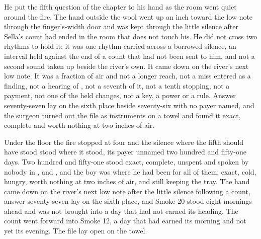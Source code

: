 He put the fifth question of the chapter to his hand as the room went quiet around the fire. The hand outside the wool went up an inch toward the low note through the finger's-width door and was kept through the little silence after Sella's count had ended in the room that does not touch his. He did not cross two rhythms to hold it: it was one rhythm carried across a borrowed silence, an interval held against the end of a count that had not been sent to him, and not a second sound taken up beside the river's own. It came down on the river's next low note. It was a fraction of air and not a longer reach, not a miss entered as a finding, not a hearing of , not a seventh of it, not a tenth stopping, not a payment, not one of the held changes, not a key, a power or a rule. Answer seventy-seven lay on the sixth place beside seventy-six with no payer named, and the surgeon turned out the file as instruments on a towel and found it exact, complete and worth nothing at two inches of air.

Under the floor the fire stopped at four and the silence where the fifth should have stood stood where it stood, its payer unnamed two hundred and fifty-one days. Two hundred and fifty-one stood exact, complete, unspent and spoken by nobody in ,  and , and the boy was where he had been for all of them: exact, cold, hungry, worth nothing at two inches of air, and still keeping the tray. The hand came down on the river's next low note after the little silence following a count, answer seventy-seven lay on the sixth place, and Smoke 20 stood eight mornings ahead and was not brought into a day that had not earned its heading. The count went forward into Smoke 12, a day that had earned its morning and not yet its evening. The file lay open on the towel.
